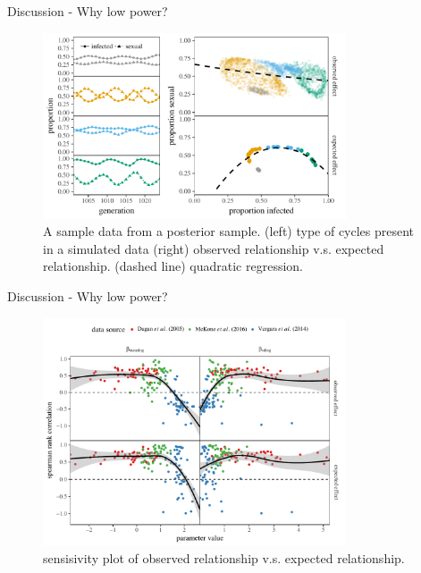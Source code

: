 \documentclass{beamer}
\begin{document}
\begin{frame}{Discussion - Why low power?}
\begin{figure}
\includegraphics[width=0.8\textwidth]{../fig/cycle_example.pdf}
\caption{A sample data from a posterior sample. (left) type of cycles present in a simulated data (right) observed relationship v.s. expected relationship. (dashed line) quadratic regression.}
\vspace{-1em}
\end{figure}
\end{frame}

\begin{frame}{Discussion - Why low power?}
\begin{figure}
\includegraphics[width=0.8\textwidth]{../fig/sensitivity.pdf}
\vspace{-1em}
\caption{sensisivity plot of observed relationship v.s. expected relationship.}
\end{figure}
\end{frame}
\end{document}
